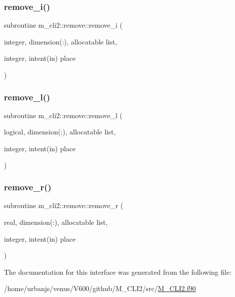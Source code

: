 \mbox{\label{interfacem__cli2_1_1remove_a4a30f737b41e6cfca58ef2842d633b27}} 
\subsubsection{\texorpdfstring{remove\+\_\+i()}{remove\_i()}}
{\footnotesize\ttfamily subroutine m\+\_\+cli2\+::remove\+::remove\+\_\+i (\begin{DoxyParamCaption}\item[{integer, dimension(\+:), allocatable}]{list,  }\item[{integer, intent(in)}]{place }\end{DoxyParamCaption})\hspace{0.3cm}{\ttfamily [private]}}

\mbox{\label{interfacem__cli2_1_1remove_a72934a0b165dc3d178ff7cbe6117a5b3}} 
\subsubsection{\texorpdfstring{remove\+\_\+l()}{remove\_l()}}
{\footnotesize\ttfamily subroutine m\+\_\+cli2\+::remove\+::remove\+\_\+l (\begin{DoxyParamCaption}\item[{logical, dimension(\+:), allocatable}]{list,  }\item[{integer, intent(in)}]{place }\end{DoxyParamCaption})\hspace{0.3cm}{\ttfamily [private]}}

\mbox{\label{interfacem__cli2_1_1remove_a13995f1150dcabb9127cfeb30a629406}} 
\subsubsection{\texorpdfstring{remove\+\_\+r()}{remove\_r()}}
{\footnotesize\ttfamily subroutine m\+\_\+cli2\+::remove\+::remove\+\_\+r (\begin{DoxyParamCaption}\item[{real, dimension(\+:), allocatable}]{list,  }\item[{integer, intent(in)}]{place }\end{DoxyParamCaption})\hspace{0.3cm}{\ttfamily [private]}}



The documentation for this interface was generated from the following file\+:\begin{DoxyCompactItemize}
\item 
/home/urbanjs/venus/\+V600/github/\+M\+\_\+\+C\+L\+I2/src/\mbox{\hyperlink{M__CLI2_8f90}{M\+\_\+\+C\+L\+I2.\+f90}}\end{DoxyCompactItemize}
